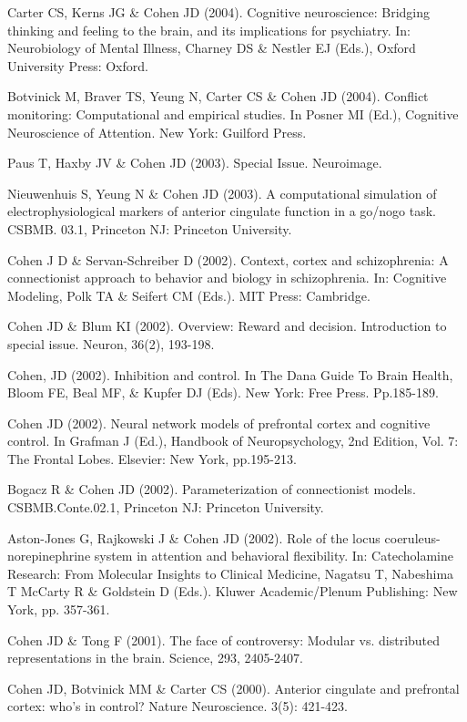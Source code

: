 \documentclass[10 pt]{article}
\begin{document}
Carter CS, Kerns JG \& Cohen JD (2004). Cognitive neuroscience: Bridging thinking and feeling to the brain, and its implications for psychiatry. In: Neurobiology of Mental Illness, Charney DS \& Nestler EJ (Eds.), Oxford University Press: Oxford.

Botvinick M, Braver TS, Yeung N, Carter CS \& Cohen JD (2004). Conflict monitoring: Computational and empirical studies. In Posner MI (Ed.), Cognitive Neuroscience of Attention. New York: Guilford
Press.

Paus T, Haxby JV \& Cohen JD (2003). Special Issue. Neuroimage.

Nieuwenhuis S, Yeung N \& Cohen JD (2003). A computational simulation of electrophysiological markers of anterior cingulate function in a go/nogo task. CSBMB. 03.1, Princeton NJ: Princeton University.

Cohen J D \& Servan-Schreiber D (2002). Context, cortex and schizophrenia: A connectionist approach to behavior and biology in schizophrenia. In: Cognitive Modeling, Polk TA \& Seifert CM (Eds.). MIT Press: Cambridge.

Cohen JD \& Blum KI (2002). Overview: Reward and decision. Introduction to special issue. Neuron, 36(2), 193-198.

Cohen, JD (2002). Inhibition and control. In The Dana Guide To Brain Health, Bloom FE, Beal MF, \& Kupfer DJ (Eds). New York: Free Press. Pp.185-189.

Cohen JD (2002). Neural network models of prefrontal cortex and cognitive control. In Grafman J (Ed.), Handbook of Neuropsychology, 2nd Edition, Vol. 7: The Frontal Lobes. Elsevier: New York, pp.195-213.

Bogacz R \& Cohen JD (2002). Parameterization of connectionist models. CSBMB.Conte.02.1, Princeton NJ: Princeton University.

Aston-Jones G, Rajkowski J \& Cohen JD (2002). Role of the locus coeruleus-norepinephrine system in attention and behavioral flexibility. In: Catecholamine Research: From Molecular Insights to
Clinical Medicine, Nagatsu T, Nabeshima T McCarty R \& Goldstein D (Eds.). Kluwer Academic/Plenum Publishing: New York, pp. 357-361.

Cohen JD \& Tong F (2001). The face of controversy: Modular vs. distributed representations in the brain. Science, 293, 2405-2407.

Cohen JD, Botvinick MM \& Carter CS (2000). Anterior cingulate and prefrontal cortex: who’s in control? Nature Neuroscience. 3(5): 421-423.
\end{document}
